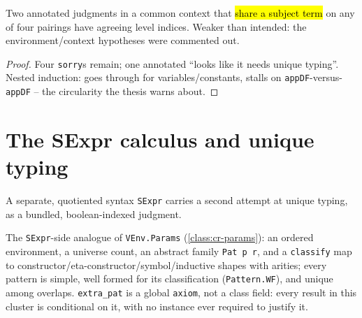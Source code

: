 \begin{lemma}
\label{thm:expb-uniqL}
\leanok
{}

 Two annotated judgments in a common context that \hl{share a subject term} on any
of four pairings have agreeing level indices.
 Weaker than intended: the environment/context hypotheses were commented out.
\end{lemma}
\begin{proof}
\stSorry{} Four \texttt{sorry}s remain; one annotated ``looks like it needs unique typing''.
 Nested induction: goes through for variables/constants, stalls on
\texttt{appDF}-versus-\texttt{appDF} -- the circularity the thesis warns about.
\end{proof}

\section{The SExpr calculus and unique typing}

A separate, quotiented syntax \texttt{SExpr} carries a second attempt at unique typing, as a
bundled, boolean-indexed judgment.

\begin{definition}
\label{class:expb-sexpr-params}
\leanok
{}

 The \texttt{SExpr}-side analogue of \texttt{VEnv.Params} (\ref{class:cr-params}): an
ordered environment, a universe count, an abstract family \texttt{Pat p r}, and a \texttt{classify}
map to constructor/eta-constructor/symbol/inductive shapes with arities; every pattern is simple,
well formed for its classification (\texttt{Pattern.WF}), and unique among overlaps.
 \texttt{extra\_pat} is a global \texttt{axiom}, not a class field: every result in
this cluster is conditional on it, with no instance ever required to justify it.
\end{definition}

